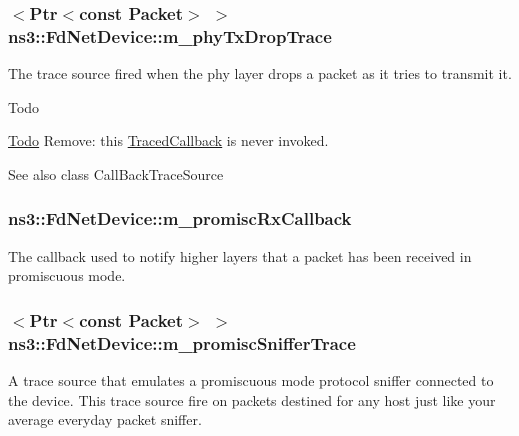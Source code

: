\subsubsection[{\texorpdfstring{m\+\_\+phy\+Tx\+Drop\+Trace}{m_phyTxDropTrace}}]{$<${\bf Ptr}$<$const {\bf Packet}$>$ $>$ ns3\+::\+Fd\+Net\+Device\+::m\+\_\+phy\+Tx\+Drop\+Trace\hspace{0.3cm}{\ttfamily [private]}}\hypertarget{classns3_1_1FdNetDevice_acd0f33f8fede665976f2485300c20810}{}\label{classns3_1_1FdNetDevice_acd0f33f8fede665976f2485300c20810}
The trace source fired when the phy layer drops a packet as it tries to transmit it.

\begin{DoxyRefDesc}{Todo}
\item[\hyperlink{todo__todo000032}{Todo}]Remove\+: this \hyperlink{classns3_1_1TracedCallback}{Traced\+Callback} is never invoked.\end{DoxyRefDesc}


\begin{DoxySeeAlso}{See also}
class Call\+Back\+Trace\+Source 
\end{DoxySeeAlso}
\subsubsection[{\texorpdfstring{m\+\_\+promisc\+Rx\+Callback}{m_promiscRxCallback}}]{ ns3\+::\+Fd\+Net\+Device\+::m\+\_\+promisc\+Rx\+Callback\hspace{0.3cm}{\ttfamily [private]}}\hypertarget{classns3_1_1FdNetDevice_aa95f558a530aca66f7fe582559902160}{}\label{classns3_1_1FdNetDevice_aa95f558a530aca66f7fe582559902160}
The callback used to notify higher layers that a packet has been received in promiscuous mode. 
\subsubsection[{\texorpdfstring{m\+\_\+promisc\+Sniffer\+Trace}{m_promiscSnifferTrace}}]{$<${\bf Ptr}$<$const {\bf Packet}$>$ $>$ ns3\+::\+Fd\+Net\+Device\+::m\+\_\+promisc\+Sniffer\+Trace\hspace{0.3cm}{\ttfamily [private]}}\hypertarget{classns3_1_1FdNetDevice_a7f43138ecf824b335eb80eeebdb91eb6}{}\label{classns3_1_1FdNetDevice_a7f43138ecf824b335eb80eeebdb91eb6}
A trace source that emulates a promiscuous mode protocol sniffer connected to the device. This trace source fire on packets destined for any host just like your average everyday packet sniffer.

